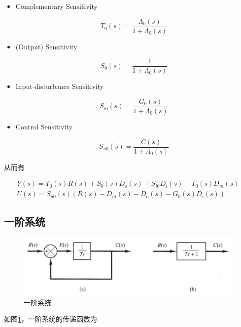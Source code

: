 \begin{itemize}
	\item Complementary Sensitivity
	
	\begin{equation*}
		T_{0}(s)=\frac{\Lambda_{0}(s)}{1+\Lambda_{0}(s)}
	\end{equation*}

	\item (Output) Sensitivity
	
	\begin{equation*}
		S_{0}(s)=\frac{1}{1+\Lambda_{0}(s)}
	\end{equation*}

	\item Input-disturbance Sensitivity
	
	\begin{equation*}
		S_{i 0}(s)=\frac{G_{0}(s)}{1+\Lambda_{0}(s)}
	\end{equation*}

	\item Control Sensitivity
	
	\begin{equation*}
		S_{u 0}(s)=\frac{C(s)}{1+\Lambda_{0}(s)}
	\end{equation*}
\end{itemize}

从而有

\begin{align*}
	Y(s)=T_{0}(s) R(s)+S_{0}(s) D_{o}(s)+S_{i 0} D_{i}(s)-T_{0}(s) D_{m}(s)\\ 
	U(s)=S_{u 0}(s)\left(R(s)-D_{m}(s)-D_{o}(s)-G_{0}(s) D_{i}(s)\right)
\end{align*}

\subsection{一阶系统}

\begin{figure}[!ht]
	\centering
	\includegraphics[width=12cm]{figures/5.png}
	\caption{一阶系统}
	\label{5}
\end{figure}

如图\ref{5}，一阶系统的传递函数为

